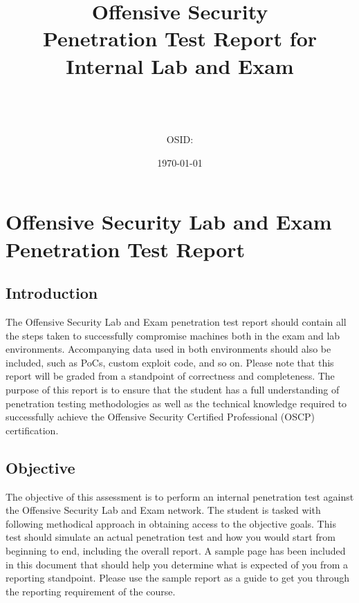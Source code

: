 \documentclass[a4paper, 10pt, oneside]{article}
\title{{\textbf{\Huge Offensive Security}}\\ Penetration Test Report for\\Internal Lab and Exam}
\author{\vspace{3cm}\\{\LARGE \name}\\[1em]\email\\[1em]OSID: \osid}
\date{\vspace{7cm}\today}
\begin{document}
\maketitle
\thispagestyle{empty}
\tableofcontents
\thispagestyle{empty}
\pagebreak

\section{Offensive	Security Lab	and	Exam Penetration	Test	Report}

\subsection{Introduction}
The	 Offensive	 Security Lab	 and	 Exam	 penetration	 test	 report should	 contain	 all	 the	 steps	 taken	 to	
successfully	compromise	machines	both	in	the	exam	and	lab	environments. Accompanying	data	used	in	
both	environments	should	also	be	included,	such	as	PoCs,	custom	exploit	code,	and	so	on.	Please	note
that	this	report	will	be	graded	from	a	standpoint	of	correctness	and	completeness. The	purpose	of	this	
report	is	 to	ensure	 that	 the	 student	 has	a	 full	 understanding	 of	 penetration	 testing	methodologies	as	
well	 as	 the	 technical	 knowledge	 required	 to	 successfully	 achieve	 the Offensive	 Security Certified	
Professional	(OSCP)	certification.

\subsection{Objective}
The	objective	of	this	assessment	is	to	perform	an	internal	penetration	test	against	the	Offensive	Security
Lab	and	Exam	network. The	student	is	tasked	with	following	methodical	approach	in	obtaining	access	to	
the	objective	goals.	This	test	should	simulate	an	actual	penetration	test	and	how	you	would	start	from	
beginning	to	end,	including	the	overall	report. A	sample	page	has	been	included	in	this	document	that	
should	help	you	determine	what	is	expected	of	you from	a	reporting	standpoint. Please	use	the	sample	
report	as	a	guide to	get	you	through	the	reporting requirement	of	the	course.
\end{document}
